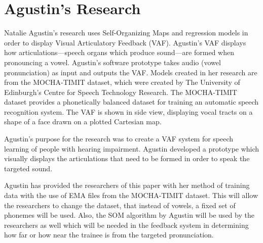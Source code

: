 \section{Agustin's Research}
Natalie Agustin's research uses Self-Organizing Maps and regression models in order to display Visual Articulatory Feedback (VAF). Agustin's VAF displays how articulations---speech organs which produce sound---are formed when pronouncing a vowel. Agustin's software prototype takes audio (vowel pronunciation) as input and outputs the VAF. Models created in her research are from the MOCHA-TIMIT dataset, which were created by The University of Edinburgh's Centre for Speech Technology Research. The MOCHA-TIMIT dataset provides a phonetically balanced dataset for training an automatic speech recognition system. The VAF is shown in side view, displaying vocal tracts on a shape of a face drawn on a plotted Cartesian map.

Agustin's purpose for the research was to create a VAF system for speech learning of people with hearing impairment. Agustin developed a prototype which visually displays the articulations that need to be formed in order to speak the targeted sound.

Agustin has provided the researchers of this paper with her method of training data with the use of EMA files from the MOCHA-TIMIT dataset. This will allow the researchers to change the dataset, that instead of vowels, a fixed set of phonemes will be used. Also, the SOM algorithm by Agustin will be used by the researchers as well which will be needed in the feedback system in determining how far or how near the trainee is from the targeted pronunciation.